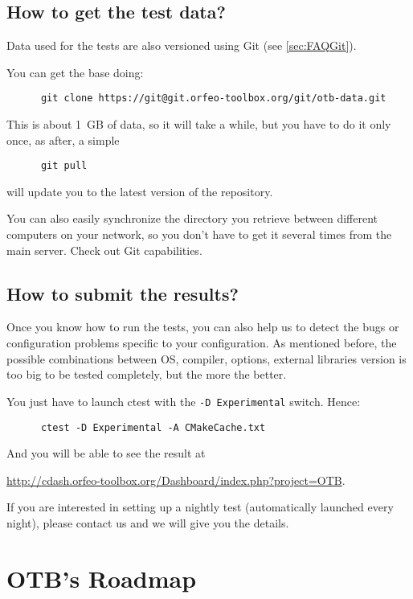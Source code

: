 \subsection{How to get the test data?}\label{sec:FAQTestData}

Data used for the tests are also versioned using Git (see \ref{sec:FAQGit}).

You can get the base doing:
\begin{verbatim}
      git clone https://git@git.orfeo-toolbox.org/git/otb-data.git
\end{verbatim}

This is about 1~GB of data, so it will take a while, but you have to do it only once, as after, a simple
\begin{verbatim}
      git pull
\end{verbatim}
will update you to the latest version of the repository.

You can also easily synchronize the directory you retrieve between different computers on your network, so you don't have to get it several times from the main server. Check out Git capabilities.

\subsection{How to submit the results?}

Once you know how to run the tests, you can also help us to detect the bugs or configuration problems specific to your configuration. As mentioned before, the possible combinations between OS, compiler, options, external libraries version is too big to be tested completely, but the more the better.

You just have to launch ctest with the \texttt{-D Experimental} switch. Hence:
\begin{verbatim}
      ctest -D Experimental -A CMakeCache.txt
\end{verbatim}

And you will be able to see the result at

\url{http://cdash.orfeo-toolbox.org/Dashboard/index.php?project=OTB}.

If you are interested in setting up a nightly test (automatically launched every night), please contact us and we will give you the details.

\section{OTB's Roadmap}

